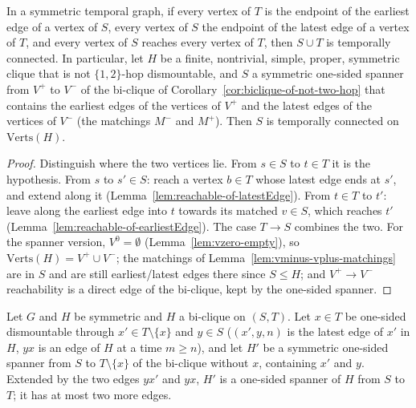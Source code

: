 \begin{theorem}
  \label{thm:tc-of-spanner-from-to}
  \leanok
  In a symmetric temporal graph, if every vertex of $T$ is the endpoint of the
  earliest edge of a vertex of $S$, every vertex of $S$ the endpoint of the
  latest edge of a vertex of $T$, and every vertex of $S$ reaches every vertex
  of $T$, then $S \cup T$ is temporally connected. In particular, let $H$ be a
  finite, nontrivial, simple, proper, symmetric clique that is not
  $\{1,2\}$-hop dismountable, and $S$ a symmetric one-sided spanner from $V^+$
  to $V^-$ of the bi-clique of Corollary~\ref{cor:biclique-of-not-two-hop} that
  contains the earliest edges of the vertices of $V^+$ and the latest edges of
  the vertices of $V^-$ (the matchings $M^-$ and $M^+$). Then $S$ is temporally
  connected on $\mathrm{Verts}(H)$.
\end{theorem}

\begin{proof}
  \leanok
  Distinguish where the two vertices lie. From $s \in S$ to $t \in T$ it is the
  hypothesis. From $s$ to $s' \in S$: reach a vertex $b \in T$ whose latest edge
  ends at $s'$, and extend along it (Lemma~\ref{lem:reachable-of-latestEdge}).
  From $t \in T$ to $t'$: leave along the earliest edge into $t$ towards its
  matched $v \in S$, which reaches $t'$ (Lemma~\ref{lem:reachable-of-earliestEdge}).
  The case $T \to S$ combines the two. For the spanner version, $V^0 = \emptyset$
  (Lemma~\ref{lem:vzero-empty}), so $\mathrm{Verts}(H) = V^+ \cup V^-$; the
  matchings of Lemma~\ref{lem:vminus-vplus-matchings} are in $S$ and are still
  earliest/latest edges there since $S \le H$; and $V^+ \to V^-$ reachability
  is a direct edge of the bi-clique, kept by the one-sided spanner.
\end{proof}

\begin{theorem}
  \label{thm:one-sided-dismountability}
  \leanok
  Let $G$ and $H$ be symmetric and $H$ a bi-clique on $(S, T)$. Let $x \in T$
  be one-sided dismountable through $x' \in T \setminus\{x\}$ and $y \in S$
  ($(x',y,n)$ is the latest edge of $x'$ in $H$, $yx$ is an edge of $H$ at a
  time $m \ge n$), and let $H'$ be a symmetric one-sided spanner from $S$ to
  $T \setminus \{x\}$ of the bi-clique without $x$, containing $x'$ and $y$.
  Extended by the two edges $yx'$ and $yx$, $H'$ is a one-sided spanner of $H$
  from $S$ to $T$; it has at most two more edges.
\end{theorem}

